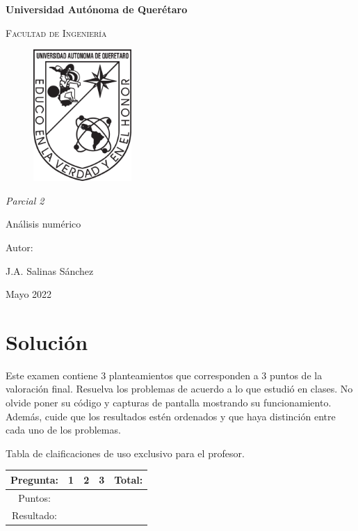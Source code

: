 \documentclass[12pt,oneside,FLEQN]{report}
\begin{document}
{
\selectfont
	\BgThispage
\begin{titlepage}
        \topmargin=1cm
        \centering

        {\bfseries\LARGE Universidad Autónoma de Querétaro \par}
        \vspace{1cm}
        {\scshape\Large  Facultad de Ingenier\'ia  \par}
        \vspace{3cm}
        \begin{figure}[!h]
        	\centering
                \includegraphics[height=5cm]{Logouaq.png}
        \end{figure}
        \vspace{2cm}
        {\itshape\large Parcial 2\par}
        \vspace{3cm}
        {\Huge Análisis numérico\par}
        \vspace{2cm}
        {\Large Autor: \par}
        {\large J.A. Salinas Sánchez \par}
        {\large Mayo 2022 \par}
\end{titlepage}
	\clearpage
	\newpage
\tableofcontents
\chapter{Solución}
	Este examen contiene 3 planteamientos que corresponden a 3 puntos de la valoración final. Resuelva los problemas de acuerdo a lo que estudió en clases. No olvide poner su código y capturas de pantalla mostrando su funcionamiento. Además, cuide que los resultados estén ordenados y que haya distinción entre cada uno de los problemas.
	\begin{center}
		Tabla de claificaciones de uso exclusivo para el profesor.\\
		\begin{tabular}{|c|c|c|c|c|}
			\hline
			Pregunta: &1&2&3&Total:\\
			\hline
			Puntos:&&&&\\
			\hline
			Resultado:&&&&\\
			\hline
		\end{tabular}
	\end{center}
}
\end{document}
